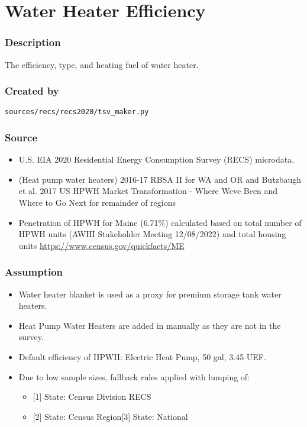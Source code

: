 \section{Water Heater Efficiency}\label{water_heater_efficiency}

\subsubsection{Description}\label{description-145}

The efficiency, type, and heating fuel of water heater.

\subsubsection{Created by}\label{created-by-146}

\texttt{sources/recs/recs2020/tsv\_maker.py}

\subsubsection{Source}\label{source-148}

\begin{itemize}
 
\item
  U.S. EIA 2020 Residential Energy Consumption Survey (RECS) microdata.
\item
  (Heat pump water heaters) 2016-17 RBSA II for WA and OR and Butzbaugh
  et al. 2017 US HPWH Market Transformation - Where
  We\textquotesingle ve Been and Where to Go Next for remainder of
  regions
\item
  Penetration of HPWH for Maine (6.71\%) calculated based on total
  number of HPWH units (AWHI Stakeholder Meeting 12/08/2022) and total
  housing units \url{https://www.census.gov/quickfacts/ME}
\end{itemize}

\subsubsection{Assumption}\label{assumption-83}

\begin{itemize}
 
\item
  Water heater blanket is used as a proxy for premium storage tank water
  heaters.
\item
  Heat Pump Water Heaters are added in manually as they are not in the
  survey.
\item
  Default efficiency of HPWH: Electric Heat Pump, 50 gal, 3.45 UEF.
\item
  Due to low sample sizes, fallback rules applied with lumping of:

  \begin{itemize}
   
  \item
    {[}1{]} State: Census Division RECS
  \item
    {[}2{]} State: Census Region{[}3{]} State: National
  \end{itemize}
\end{itemize}

